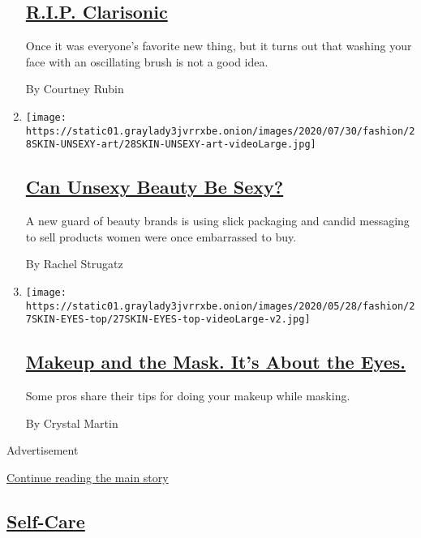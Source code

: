 \begin{enumerate}
  \hypertarget{rip-clarisonic}{%
  \subsection{\texorpdfstring{\href{/2020/08/05/style/skin-care-rip-clarisonic.html}{R.I.P.
  Clarisonic}}{R.I.P. Clarisonic}}\label{rip-clarisonic}}

  Once it was everyone's favorite new thing, but it turns out that
  washing your face with an oscillating brush is not a good idea.

  By Courtney Rubin
\item
  \texttt{[image: https://static01.graylady3jvrrxbe.onion/images/2020/07/30/fashion/28SKIN-UNSEXY-art/28SKIN-UNSEXY-art-videoLarge.jpg]}

  \hypertarget{can-unsexy-beauty-be-sexy}{%
  \subsection{\texorpdfstring{\href{/2020/07/28/style/can-unsexy-beauty-be-sexy.html}{Can
  Unsexy Beauty Be
  Sexy?}}{Can Unsexy Beauty Be Sexy?}}\label{can-unsexy-beauty-be-sexy}}

  A new guard of beauty brands is using slick packaging and candid
  messaging to sell products women were once embarrassed to buy.

  By Rachel Strugatz
\item
  \texttt{[image: https://static01.graylady3jvrrxbe.onion/images/2020/05/28/fashion/27SKIN-EYES-top/27SKIN-EYES-top-videoLarge-v2.jpg]}

  \hypertarget{makeup-and-the-mask-its-about-the-eyes}{%
  \subsection{\texorpdfstring{\href{/2020/05/26/style/makeup-and-the-mask-its-about-the-eyes.html}{Makeup
  and the Mask. It's About the
  Eyes.}}{Makeup and the Mask. It's About the Eyes.}}\label{makeup-and-the-mask-its-about-the-eyes}}

  Some pros share their tips for doing your makeup while masking.

  By Crystal Martin
\end{enumerate}

Advertisement

\protect\hyperlink{after-mid3}{Continue reading the main story}

\hypertarget{self-care}{%
\subsection{\texorpdfstring{\href{/section/style/self-care}{Self-Care}}{Self-Care}}\label{self-care}}

